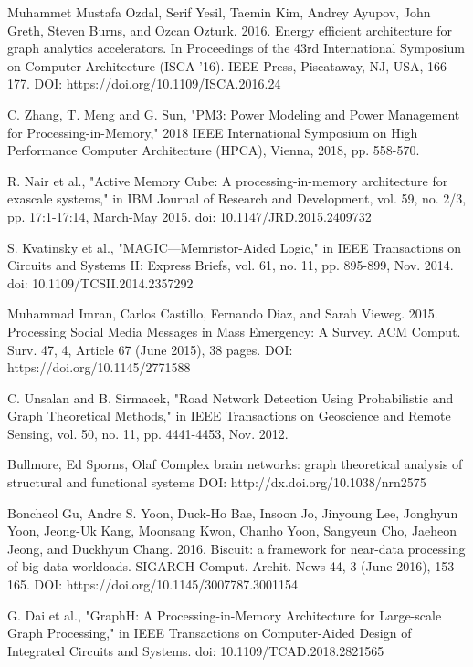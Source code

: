 \documentclass[journal,onecolumn]{IEEEtran}
\begin{document}
\begin{thebibliography}{10}
 Muhammet Mustafa Ozdal, Serif Yesil, Taemin Kim, Andrey Ayupov, John Greth, Steven Burns, and Ozcan Ozturk. 2016. Energy efficient architecture for graph analytics accelerators. In Proceedings of the 43rd International Symposium on Computer Architecture (ISCA '16). IEEE Press, Piscataway, NJ, USA, 166-177. DOI: https://doi.org/10.1109/ISCA.2016.24

 C. Zhang, T. Meng and G. Sun, "PM3: Power Modeling and Power Management for Processing-in-Memory," 2018 IEEE International Symposium on High Performance Computer Architecture (HPCA), Vienna, 2018, pp. 558-570.

 R. Nair et al., "Active Memory Cube: A processing-in-memory architecture for exascale systems," in IBM Journal of Research and Development, vol. 59, no. 2/3, pp. 17:1-17:14, March-May 2015.
doi: 10.1147/JRD.2015.2409732

 S. Kvatinsky et al., "MAGIC—Memristor-Aided Logic," in IEEE Transactions on Circuits and Systems II: Express Briefs, vol. 61, no. 11, pp. 895-899, Nov. 2014.
doi: 10.1109/TCSII.2014.2357292

 Muhammad Imran, Carlos Castillo, Fernando Diaz, and Sarah Vieweg. 2015. Processing Social Media Messages in Mass Emergency: A Survey. ACM Comput. Surv. 47, 4, Article 67 (June 2015), 38 pages. DOI: https://doi.org/10.1145/2771588

 C. Unsalan and B. Sirmacek, "Road Network Detection Using Probabilistic and Graph Theoretical Methods," in IEEE Transactions on Geoscience and Remote Sensing, vol. 50, no. 11, pp. 4441-4453, Nov. 2012.

 Bullmore, Ed
 Sporns, Olaf
 Complex brain networks: graph theoretical analysis of structural and functional systems
 DOI: http://dx.doi.org/10.1038/nrn2575

 Boncheol Gu, Andre S. Yoon, Duck-Ho Bae, Insoon Jo, Jinyoung Lee, Jonghyun Yoon, Jeong-Uk Kang, Moonsang Kwon, Chanho Yoon, Sangyeun Cho, Jaeheon Jeong, and Duckhyun Chang. 2016. Biscuit: a framework for near-data processing of big data workloads. SIGARCH Comput. Archit. News 44, 3 (June 2016), 153-165. DOI: https://doi.org/10.1145/3007787.3001154

 G. Dai et al., "GraphH: A Processing-in-Memory Architecture for Large-scale Graph Processing," in IEEE Transactions on Computer-Aided Design of Integrated Circuits and Systems.
doi: 10.1109/TCAD.2018.2821565


\end{thebibliography}
\end{document}
